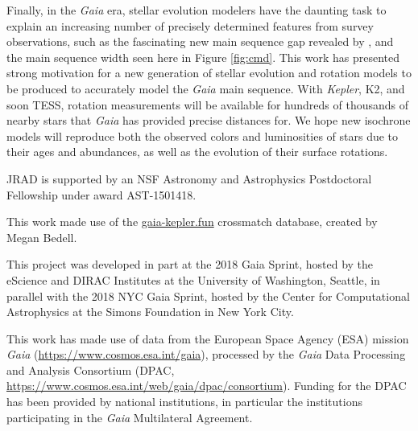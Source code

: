 \documentclass[preprint2]{aastex62}
\newcommand{\Kepler}{\textsl{Kepler}\xspace}
\begin{document}
Finally, in the {\em Gaia} era, stellar evolution modelers have the daunting task to explain an increasing number of precisely determined features from survey observations, such as the fascinating new main sequence gap revealed by \citet{jao2018}, and the main sequence width seen here in Figure \ref{fig:cmd}.
This work has presented strong motivation for a new generation of stellar evolution and rotation models to be produced to accurately model the {\em Gaia} main sequence. With \Kepler, K2, and soon TESS, rotation measurements will be available for hundreds of thousands of nearby stars that {\em Gaia} has provided precise distances for. We hope new isochrone models will reproduce both the observed colors and luminosities of stars due to their ages and abundances, as well as the evolution of their surface rotations. 


\acknowledgments

JRAD is supported by an NSF Astronomy and Astrophysics Postdoctoral Fellowship under award AST-1501418. 

This work made use of the \url{gaia-kepler.fun} crossmatch database, created by Megan Bedell.

This project was developed in part at the 2018 Gaia Sprint, hosted by the eScience and DIRAC Institutes at the University of Washington, Seattle, in parallel with the 2018 NYC Gaia Sprint, hosted by the Center for Computational Astrophysics at the Simons Foundation in New York City.

This work has made use of data from the European Space Agency (ESA) mission
{\it Gaia} (\url{https://www.cosmos.esa.int/gaia}), processed by the {\it Gaia}
Data Processing and Analysis Consortium (DPAC,
\url{https://www.cosmos.esa.int/web/gaia/dpac/consortium}). Funding for the DPAC
has been provided by national institutions, in particular the institutions
participating in the {\it Gaia} Multilateral Agreement.





\end{document}
